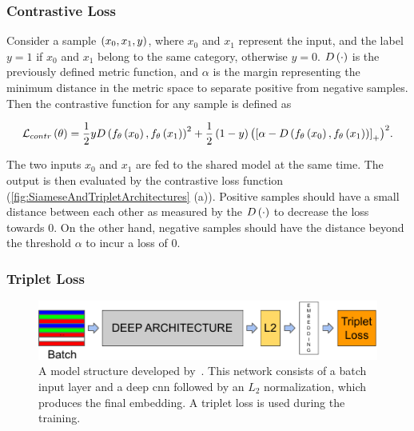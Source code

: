 \subsubsection{Contrastive Loss}

Consider a sample $\left( {x_0, x_1, y} \right)$, where $x_0$ and $x_1$ represent the input, and the label $y = 1$ if $x_0$ and $x_1$ belong to the same category, otherwise $y = 0$. ${D} \left( \cdot \right)$ is the previously defined metric function, and $\alpha$ is the margin representing the minimum distance in the metric space to separate positive from negative samples. Then the contrastive function for any sample is defined as~\cite{Hadsell2006}

\begin{equation}
    \label{eq:ContrastiveLoss}
    {\mathcal{L}_{contr}} \left( \theta \right) = 
    \frac{1}{2}y
    {{D} \left( {f_\theta} \left( x_0 \right), {f_\theta} \left( x_1 \right) \right)}^2 +
    \frac{1}{2}
    \left( {1 - y} \right) {\left( {
    \left[ {\alpha - {D} \left( {f_\theta} \left( x_0 \right), {f_\theta} \left( x_1 \right) \right)} \right]_{+}} \right)}^2.
\end{equation}

\noindent The two inputs $x_0$ and $x_1$ are fed to the shared model at the same time. The output is then evaluated by the contrastive loss function (\cref{fig:SiameseAndTripletArchitectures} (a)). Positive samples should have a small distance between each other as measured by the ${D} \left( \cdot \right)$ to decrease the loss towards $0$. On the other hand, negative samples should have the distance beyond the threshold $\alpha$ to incur a loss of $0$.

\subsubsection{Triplet Loss}

\begin{figure}[t]
    \centerline{\includegraphics[width=0.8\linewidth]{figures/theoretical_foundations/triplet_loss_model_structure.pdf}}
    \caption[Triplet loss architecture]{A model structure developed by~\cite{Schroff2015}. This network consists of a batch input layer and a deep \gls{cnn} followed by an $L_2$ normalization, which produces the final embedding. A triplet loss is used during the training. }
    \label{fig:TripletLossModelStructure}
\end{figure}

